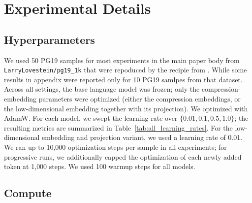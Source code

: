 \newpage
\appendix

\renewcommand{\topfraction}{0.9}
\renewcommand{\bottomfraction}{0.8}
\renewcommand{\dbltopfraction}{0.9}
\renewcommand{\floatpagefraction}{0.85}
\renewcommand{\dblfloatpagefraction}{0.8}
\renewcommand{\textfraction}{0.07}
\setcounter{topnumber}{4}
\setcounter{bottomnumber}{4}
\setcounter{totalnumber}{6}
\setcounter{dbltopnumber}{4}

\section{Experimental Details}
\label{app:part_setup}

\subsection{Hyperparameters}

We used 50 PG19 samples for most experiments in the main paper body from \texttt{LarryLovestein/pg19\_1k} that were repoduced by the recipie from \cite{kuratov2025cramming}. While some results in appendix were reported only for 10 PG19 samlpes from that dataset.
Across all settings, the base language model was frozen; only the compression-embedding parameters were optimized (either the compression embeddings, or the low-dimensional embedding together with its projection).
We optimized with AdamW. For each model, we swept the learning rate over \(\{0.01, 0.1, 0.5, 1.0\}\); the resulting metrics are summarized in Table~\ref{tab:all_learning_rates}. For the low-dimensional embedding and projection variant, we used a learning rate of 0.01.
We ran up to 10{,}000 optimization steps per sample in all experiments; for progressive runs, we additionally capped the optimization of each newly added token at 1{,}000 steps.
We used 100 warmup steps for all models.

\subsection{Compute}

